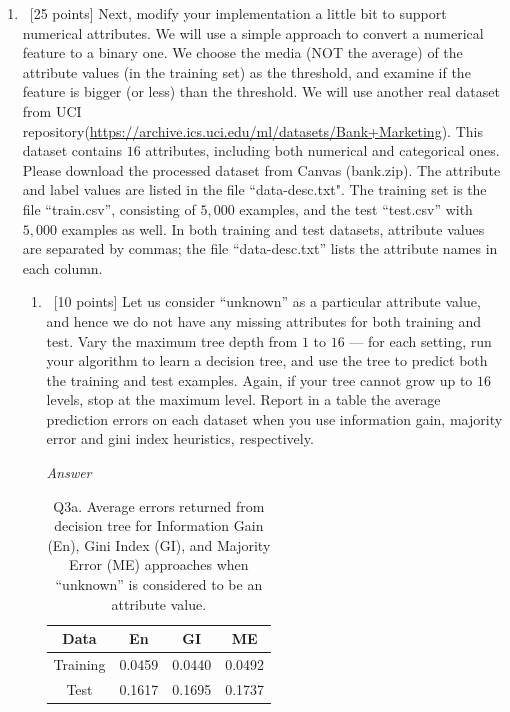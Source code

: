 \documentclass[12pt, fullpage,letterpaper]{article}
\begin{document}
\begin{enumerate}
\begin{enumerate}
\end{enumerate}


\item~[25 points] Next, modify your implementation a little bit to support numerical attributes. We will use a simple approach to convert a numerical feature to a binary one. We choose the media (NOT the average) of the attribute values (in the training set) as the threshold, and examine if the feature is bigger (or less) than the threshold. We will use another real dataset from UCI repository(\url{https://archive.ics.uci.edu/ml/datasets/Bank+Marketing}). This dataset contains $16$ attributes, including both numerical and categorical ones. Please download the processed dataset from Canvas (bank.zip).  The attribute and label values are listed in the file ``data-desc.txt". The training set is the file ``train.csv'', consisting of $5,000$ examples, and the test  ``test.csv'' with $5,000$ examples as well.  In both training and test datasets, attribute values are separated by commas; the file ``data-desc.txt''  lists the attribute names in each column. 
\begin{enumerate}
	\item~[10 points] Let us consider ``unknown'' as a particular attribute value, and hence we do not have any missing attributes for both training and test. Vary the maximum  tree depth from $1$ to $16$ --- for each setting, run your algorithm to learn a decision tree, and use the tree to  predict both the training  and test examples. Again, if your tree cannot grow up to $16$ levels, stop at the maximum level. Report in a table the average prediction errors on each dataset when you use information gain, majority error and gini index heuristics, respectively.
	
	\emph{Answer}
	
	\begin{table}[h]
    	\centering
    	\begin{tabular}{c|ccc}
    		Data & En & GI & ME \\ 
    		\hline\hline
    		Training &  0.0459 & 0.0440 & 0.0492 \\ \hline
    		Test &  0.1617 & 0.1695 & 0.1737 \\ \hline
    	\end{tabular}
    	\caption{Q3a. Average errors returned from decision tree for Information Gain (En), Gini Index (GI), and Majority Error (ME) approaches when ``unknown'' is considered to be an attribute value.}
    \end{table}
	

\end{enumerate}
\end{enumerate}
\end{document}
